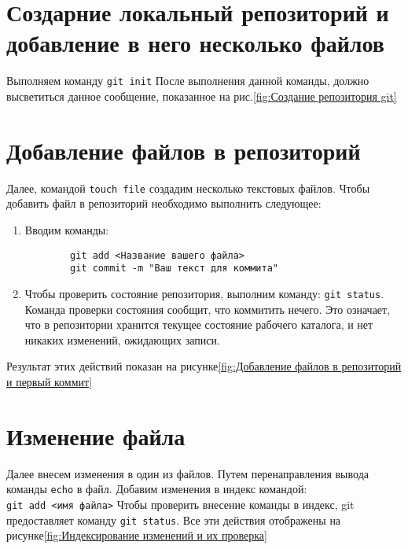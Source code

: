 
\section{Создарние локальный репозиторий и добавление в него несколько файлов}

Выполняем команду \texttt{git init}
После выполнения данной команды, должно высветиться данное сообщение, показанное на рис.\ref{fig:Создание репозитория git}



\section{Добавление файлов в репозиторий}
Далее, командой \texttt{touch file} создадим несколько текстовых файлов.
Чтобы добавить файл в репозиторий необходимо выполнить следующее:
\begin{enumerate}
	\item Вводим команды:
	\begin{verbatim}
		git add <Название вашего файла>
		git commit -m "Ваш текст для коммита"
	\end{verbatim}
	\item Чтобы проверить состояние репозитория,
	выполним команду: \texttt{git~status}.
	Команда проверки состояния сообщит, что коммитить нечего.
	Это означает, что в репозитории хранится текущее состояние
	рабочего каталога, и нет никаких изменений, ожидающих записи.
\end{enumerate}
Результат этих действий показан на рисунке\ref{fig:Добавление файлов в репозиторий и первый коммит}



\section{Изменение файла}

Далее внесем изменения в один из файлов.
Путем перенаправления вывода команды
\texttt{echo} в файл.
Добавим изменения в индекс командой:
\texttt{git~add~<имя~файла>}
Чтобы проверить внесение команды в индекс,
git предоставляет команду \texttt{git~status}.
Все эти действия отображены
на рисунке\ref{fig:Индексирование изменений и их проверка}


